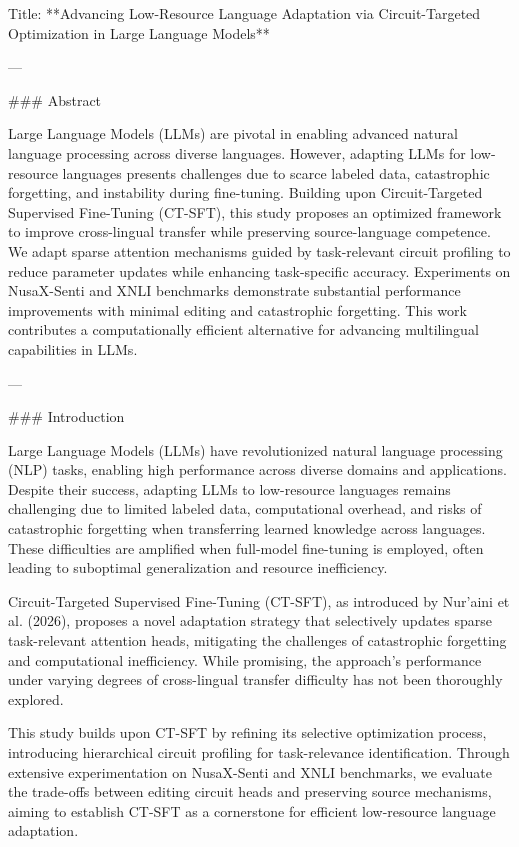 Title: **Advancing Low-Resource Language Adaptation via Circuit-Targeted Optimization in Large Language Models**

---

### Abstract

Large Language Models (LLMs) are pivotal in enabling advanced natural language processing across diverse languages. However, adapting LLMs for low-resource languages presents challenges due to scarce labeled data, catastrophic forgetting, and instability during fine-tuning. Building upon Circuit-Targeted Supervised Fine-Tuning (CT-SFT), this study proposes an optimized framework to improve cross-lingual transfer while preserving source-language competence. We adapt sparse attention mechanisms guided by task-relevant circuit profiling to reduce parameter updates while enhancing task-specific accuracy. Experiments on NusaX-Senti and XNLI benchmarks demonstrate substantial performance improvements with minimal editing and catastrophic forgetting. This work contributes a computationally efficient alternative for advancing multilingual capabilities in LLMs.

---

### Introduction

Large Language Models (LLMs) have revolutionized natural language processing (NLP) tasks, enabling high performance across diverse domains and applications. Despite their success, adapting LLMs to low-resource languages remains challenging due to limited labeled data, computational overhead, and risks of catastrophic forgetting when transferring learned knowledge across languages. These difficulties are amplified when full-model fine-tuning is employed, often leading to suboptimal generalization and resource inefficiency.

Circuit-Targeted Supervised Fine-Tuning (CT-SFT), as introduced by Nur’aini et al. (2026), proposes a novel adaptation strategy that selectively updates sparse task-relevant attention heads, mitigating the challenges of catastrophic forgetting and computational inefficiency. While promising, the approach's performance under varying degrees of cross-lingual transfer difficulty has not been thoroughly explored.

This study builds upon CT-SFT by refining its selective optimization process, introducing hierarchical circuit profiling for task-relevance identification. Through extensive experimentation on NusaX-Senti and XNLI benchmarks, we evaluate the trade-offs between editing circuit heads and preserving source mechanisms, aiming to establish CT-SFT as a cornerstone for efficient low-resource language adaptation.

